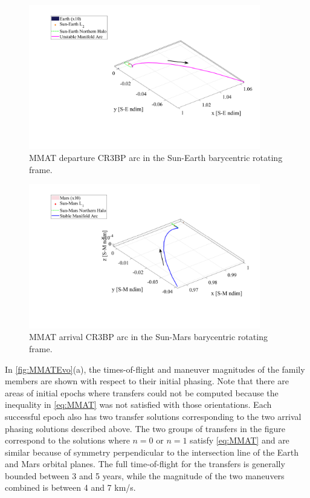 \begin{figure}[ht]
    \centering
    \includegraphics[width=0.9\textwidth]{figures/MinDvSE.pdf}
    \caption{MMAT departure CR3BP arc in the Sun-Earth barycentric rotating frame.}
    \label{fig:MMATSE}
\end{figure}

\begin{figure}[ht]
    \centering
    \includegraphics[width=0.9\textwidth]{figures/MinDvSM.pdf}
    \caption{MMAT arrival CR3BP arc in the Sun-Mars barycentric rotating frame.}
    \label{fig:MMATSM}
\end{figure}

In \cref{fig:MMATEvo}(a), the times-of-flight and maneuver magnitudes of the family members are
shown with respect to their initial phasing. Note that there are areas of initial epochs where
transfers could not be computed because the inequality in \cref{eq:MMAT} was not satisfied with
those orientations. Each successful epoch also has two transfer solutions corresponding to the two
arrival phasing solutions described above. The two groups of transfers in the figure correspond to 
the solutions where $n=0$ or $n=1$ satisfy \cref{eq:MMAT} and are similar because of symmetry
perpendicular to the intersection line of the Earth and Mars orbital planes. The full
time-of-flight for the transfers is generally bounded between 3 and 5 years, while the magnitude of
the two maneuvers combined is between 4 and 7 km/s.

